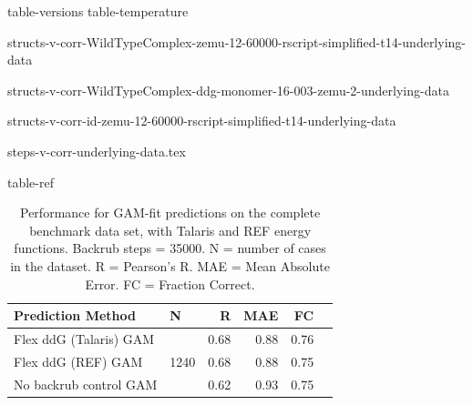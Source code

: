 \documentclass[journal=jpcbfk,manuscript=suppinfo]{achemso}
\begin{document}
\renewcommand{\thefigure}{S\arabic{figure}}
\setcounter{figure}{0}
\renewcommand{\thetable}{S\arabic{table}}
\setcounter{table}{0}
\renewcommand*{\thepage}{S\arabic{page}}

{table-versions}
{table-temperature}
\clearpage

\clearpage

  {\small
    {structs-v-corr-WildTypeComplex-zemu-12-60000-rscript-simplified-t14-underlying-data}
  }
\clearpage

\clearpage
  {\small
    {structs-v-corr-WildTypeComplex-ddg-monomer-16-003-zemu-2-underlying-data}
  }
\clearpage

\clearpage
  {\small
    {structs-v-corr-id-zemu-12-60000-rscript-simplified-t14-underlying-data}
  }
\clearpage

{\small
  {steps-v-corr-underlying-data.tex}
}

{table-ref}

\begin{table}
  \begin{tabular}{llrrrr}
\toprule
Prediction Method &     N &    R &  MAE &   FC \\
\midrule
 Flex ddG (Talaris) GAM & \multirow{ 4}{*}{1240} & 0.68 & 0.88 & 0.76 \\
 Flex ddG (REF) GAM & & 0.68 & 0.88 & 0.75  \\
 No backrub control GAM & & 0.62 & 0.93 & 0.75  \\
\bottomrule
\end{tabular}
  \caption[]{
    Performance for GAM-fit predictions on the complete benchmark data set, with Talaris\cite{song_structure-guided_2011,shapovalov_smoothed_2011,omeara_combined_2015} and REF\cite{alford_rosetta_2017} energy functions. Backrub steps = 35000. N = number of cases in the dataset. R = Pearson's R. MAE = Mean Absolute Error. FC = Fraction Correct.
  } \label{tab:table-gam-fit}
\end{table}
\end{document}

